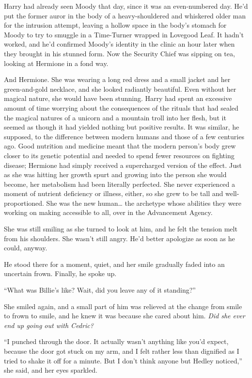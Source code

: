 Harry had already seen Moody that day, since it was an even-numbered
day. He'd put the former auror in the body of a heavy-shouldered and
whiskered older man for the intrusion attempt, leaving a hollow space in
the body's stomach for Moody to try to smuggle in a Time-Turner wrapped
in Lovegood Leaf. It hadn't worked, and he'd confirmed Moody's identity
in the clinic an hour later when they brought in his stunned form. Now
the Security Chief was sipping on tea, looking at Hermione in a fond
way.

And Hermione. She was wearing a long red dress and a small jacket and
her green-and-gold necklace, and she looked radiantly beautiful. Even
without her magical nature, she would have been stunning. Harry had
spent an excessive amount of time worrying about the consequences of the
rituals that had sealed the magical natures of a unicorn and a mountain
troll into her flesh, but it seemed as though it had yielded nothing but
positive results. It was similar, he supposed, to the difference between
modern humans and those of a few centuries ago. Good nutrition and
medicine meant that the modern person's body grew closer to its genetic
potential and needed to spend fewer resources on fighting disease;
Hermione had simply received a supercharged version of the effect. Just
as she was hitting her growth spurt and growing into the person she
would become, her metabolism had been literally perfected. She never
experienced a moment of nutrient deficiency or illness, either, so she
grew to be tall and well-proportioned. She was the new human\ldots{} the
archetype whose abilities they were working on making accessible to all,
over in the Advancement Agency.

She was still smiling as she turned to look at him, and he felt the
tension melt from his shoulders. She wasn't still angry. He'd better
apologize as soon as he could, anyway.

He stood there for a moment, quiet, and her smile gradually faded into
an uncertain frown. Finally, he spoke up.

``What was Billie's like? Wait, did you leave any of it standing?''

She smiled again, and a small part of him was relieved at the change
from smile to frown to smile, and he knew it was because she cared about
him. \emph{Did she ever end up going out with Cedric?}

``I punched through the door. It actually wasn't anything like you'd
expect, because the door got stuck on my arm, and I felt rather less
than dignified as I tried to shake it off for a minute. But I don't
think anyone but Hedley noticed,'' she said, and her eyes sparkled.

